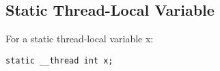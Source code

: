 \begin{description}
\begin{table}[H]
\Hrule
\caption{Initial Exec Model Code Sequence, II}
\begin{center}
\small{}
\end{center}
\Hrule
\end{table}

\end{description}

\subsection{Static Thread-Local Variable}

For a static thread-local variable x:

\begin{verbatim}
static __thread int x;
\end{verbatim}

